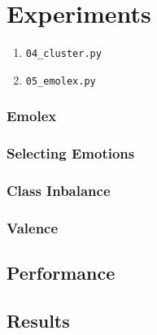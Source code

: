 \chapter{Experiments}\label{chap:Experiments}


\begin{enumerate}
  \item \lstinline{04_cluster.py}
  \item \lstinline{05_emolex.py}
\end{enumerate}

\subsection{Emolex}\label{sub:Emolex}
\subsection{Selecting Emotions}\label{sub:Selecting Emotions}
\subsection{Class Inbalance}\label{sub:Class Inbalance}
\subsection{Valence}\label{sub:Valence}





\section{Performance}\label{sec:Performance}

\section{Results}\label{sec:Results}

